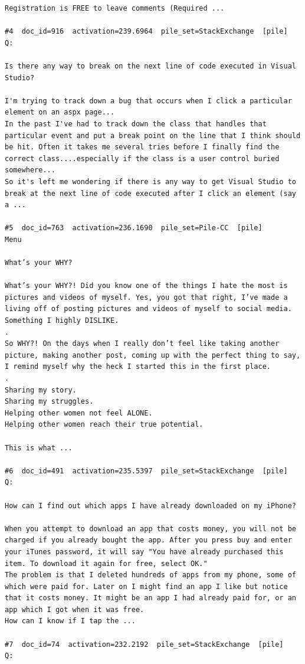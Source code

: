 \begin{verbatim}
Registration is FREE to leave comments (Required ...

#4  doc_id=916  activation=239.6964  pile_set=StackExchange  [pile]
Q:

Is there any way to break on the next line of code executed in Visual Studio?

I'm trying to track down a bug that occurs when I click a particular element on an aspx page...
In the past I've had to track down the class that handles that particular event and put a break point on the line that I think should be hit. Often it takes me several tries before I finally find the correct class....especially if the class is a user control buried somewhere...
So it's left me wondering if there is any way to get Visual Studio to break at the next line of code executed after I click an element (say a ...

#5  doc_id=763  activation=236.1690  pile_set=Pile-CC  [pile]
Menu

What’s your WHY?

What’s your WHY?! Did you know one of the things I hate the most is pictures and videos of myself. Yes, you got that right, I’ve made a living off of posting pictures and videos of myself to social media. Something I highly DISLIKE.
.
So WHY?! On the days when I really don’t feel like taking another picture, making another post, coming up with the perfect thing to say, I remind myself why the heck I started this in the first place.
.
Sharing my story.
Sharing my struggles.
Helping other women not feel ALONE.
Helping other women reach their true potential.

This is what ...

#6  doc_id=491  activation=235.5397  pile_set=StackExchange  [pile]
Q:

How can I find out which apps I have already downloaded on my iPhone?

When you attempt to download an app that costs money, you will not be charged if you already bought the app. After you press buy and enter your iTunes password, it will say "You have already purchased this item. To download it again for free, select OK."
The problem is that I deleted hundreds of apps from my phone, some of which were paid for. Later on I might find an app I like but notice that it costs money. It might be an app I had already paid for, or an app which I got when it was free.
How can I know if I tap the ...

#7  doc_id=74  activation=232.2192  pile_set=StackExchange  [pile]
Q:


\end{verbatim}
